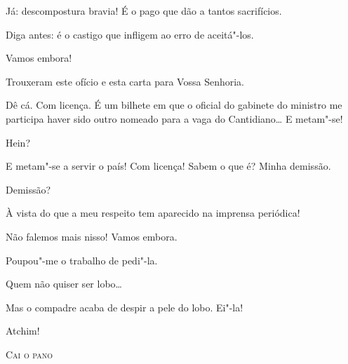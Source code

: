 \begin{linenumbers}
 Já: descompostura bravia! É o pago que dão a tantos
sacrifícios.

 Diga antes: é o castigo que infligem ao erro de aceitá"-los.

  Vamos embora! 




  Trouxeram este ofício e esta carta
para Vossa Senhoria. 

 Dê cá.  Com licença. 
É um bilhete em que o oficial do gabinete do ministro
me participa haver sido outro nomeado para a vaga do Cantidiano\ldots{} E
metam"-se!

 Hein?

 E metam"-se a servir o país!  Com
licença!  Sabem o que
é? Minha demissão.

 Demissão?

 À vista do que a meu respeito tem aparecido na imprensa
periódica!

 Não falemos mais nisso! Vamos embora.

 Poupou"-me o trabalho de pedi"-la.

 Quem não quiser ser lobo\ldots{}

 Mas o compadre acaba de despir a pele do
lobo.  Ei"-la!

 Atchim! 

\vspace{1cm}

\begin{center}
\textsc{Cai o pano}
\end{center}

\end{linenumbers}


